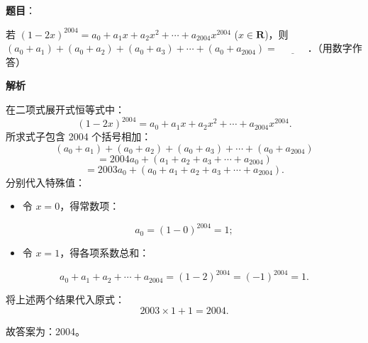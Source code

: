 \begin{answer}

\textbf{题目}：

若 $(1 - 2x)^{2004} = a_0 + a_1 x + a_2 x^2 + \cdots + a_{2004} x^{2004}$ ($x \in \mathbf{R}$)，则 $(a_0 + a_1) + (a_0 + a_2) + (a_0 + a_3) + \cdots + (a_0 + a_{2004}) = \underline{\hspace{3em}}$．（用数字作答）

\textbf{解析}

在二项式展开式恒等式中：
\nopagebreak[4]
\[
(1 - 2x)^{2004} = a_0 + a_1 x + a_2 x^2 + \cdots + a_{2004} x^{2004}.
\]
所求式子包含 2004 个括号相加：
\nopagebreak[4]
\[
(a_0 + a_1) + (a_0 + a_2) + (a_0 + a_3) + \cdots + (a_0 + a_{2004})
\]
\nopagebreak[4]
\[
= 2004 a_0 + (a_1 + a_2 + a_3 + \cdots + a_{2004})
\]
\nopagebreak[4]
\[
= 2003 a_0 + (a_0 + a_1 + a_2 + a_3 + \cdots + a_{2004}).
\]
分别代入特殊值：
\begin{itemize}
\item 令 $x = 0$，得常数项：
\end{itemize}
\nopagebreak[4]
\[
a_0 = (1 - 0)^{2004} = 1;
\]
\begin{itemize}
\item 令 $x = 1$，得各项系数总和：
\end{itemize}
\nopagebreak[4]
\[
a_0 + a_1 + a_2 + \cdots + a_{2004} = (1 - 2)^{2004} = (-1)^{2004} = 1.
\]

将上述两个结果代入原式：
\nopagebreak[4]
\[
2003 \times 1 + 1 = 2004.
\]

故答案为：2004。


\end{answer}
